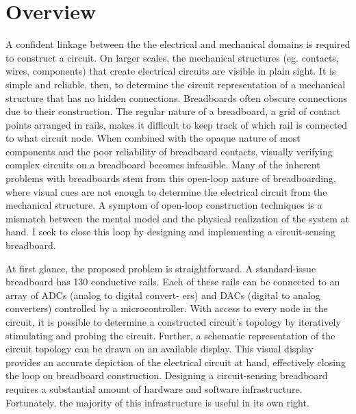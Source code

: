 \documentclass[11pt, a4paper]{article}
\begin{document}
\section{Overview}

A confident linkage between the the electrical and mechanical domains is required to construct a circuit.
On larger scales, the mechanical structures (eg. contacts, wires, components) that create electrical circuits are visible in plain sight. 
It is simple and reliable, then, to determine the circuit representation of a mechanical structure that has no hidden connections. 
Breadboards often obscure connections due to their construction. 
The regular nature of a breadboard, a grid of contact points arranged in rails, makes it difficult to keep track of which rail is connected to what circuit node.
When combined with the opaque nature of most components and the poor reliability of breadboard contacts, visually verifying complex circuits on a breadboard becomes infeasible. 
Many of the inherent problems with breadboards stem from this open-loop nature of breadboarding, where visual cues are not enough to determine the electrical circuit from the mechanical structure. 
A symptom of open-loop construction techniques is a mismatch between the mental model and the physical realization of the system at hand. 
I seek to close this loop by designing and implementing a circuit-sensing breadboard.

At first glance, the proposed problem is straightforward. 
A standard-issue breadboard has 130 conductive rails. 
Each of these rails can be connected to an array of ADCs (analog to digital convert-
ers) and DACs (digital to analog converters) controlled by a microcontroller. 
With access to every node in the circuit, it is possible to determine a constructed circuit's topology by iteratively stimulating and probing the circuit. 
Further, a schematic representation of the circuit topology can be drawn on an available display.
This visual display provides an accurate depiction of the electrical circuit at hand, effectively closing the loop on breadboard construction.
Designing a circuit-sensing breadboard requires a substantial amount of hardware and software infrastructure. 
Fortunately, the majority of this infrastructure is useful in its own right. 
\end{document}
